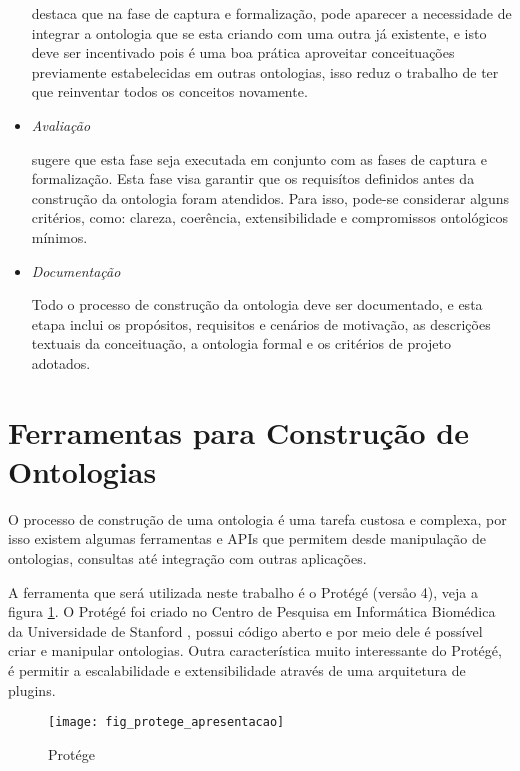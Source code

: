 \begin{itemize}
    \cite{falbo1998integracao} destaca que na fase de captura e formalização,
    pode aparecer a necessidade de integrar a ontologia que se esta criando com
    uma outra já existente, e isto deve ser incentivado pois é uma boa prática
    aproveitar conceituações previamente estabelecidas em outras ontologias,
    isso reduz o trabalho de ter que reinventar todos os conceitos novamente.

    \item \textit{Avaliação}

    \cite{guizzardidesenvolvimento} sugere que esta fase seja executada em
    conjunto com as fases de captura e formalização. Esta fase visa garantir
    que os requisítos definidos antes da construção da ontologia foram atendidos.
    Para isso, pode-se considerar alguns critérios, como: clareza, coerência,
    extensibilidade e compromissos ontológicos mínimos.

    \item \textit{Documentação}

    Todo o processo de construção da ontologia deve ser documentado, e esta etapa
    inclui os propósitos, requisitos e cenários de motivação, as descrições
    textuais da conceituação, a ontologia formal e os critérios de projeto
    adotados.
\end{itemize}

\section{Ferramentas para Construção de Ontologias}
\label{sec:ferramentas_para_construcao_de_ontologias}

O processo de construção de uma ontologia é uma tarefa custosa e complexa, por
isso existem algumas ferramentas e APIs que permitem desde manipulação de
ontologias, consultas até integração com outras aplicações.

A ferramenta que será utilizada neste trabalho é o Protégé (versåo 4),
veja a figura \ref{fig:fig_protege_apresentacao}. O Protégé foi criado
no Centro de Pesquisa em Informática Biomédica da Universidade de Stanford
\cite{protege}, possui código aberto e por meio dele é possível criar e
manipular ontologias. Outra característica muito interessante do Protégé,
é permitir a escalabilidade e extensibilidade através de uma arquitetura de
plugins.

\begin{figure}[!h]
  \centering
  \texttt{[image: fig\_protege\_apresentacao]}
  \caption{Protége}
  \label{fig:fig_protege_apresentacao}
\end{figure}

